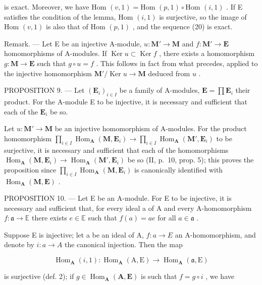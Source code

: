 is exact. Moreover, we have Hom \((v, 1) = \text{Hom } (p, 1) \circ \text{Hom } (i, 1)\) . If E satisfies the condition of the lemma, Hom \((i, 1)\) is surjective, so the image of Hom \((v, 1)\) is also that of Hom \((p, 1)\) , and the sequence (20) is exact.

Remark. --- Let E be an injective A-module, \(u: \mathbf{M}' \to \mathbf{M}\) and \(f: \mathbf{M}' \to \mathbf{E}\) homomorphisms of A-modules. If \(\operatorname{Ker} u \subset \operatorname{Ker} f\) , there exists a homomorphism \(g: \mathbf{M} \to \mathbf{E}\) such that \(g \circ u = f\) . This follows in fact from what precedes, applied to the injective homomorphism \(\mathbf{M}' / \operatorname{Ker} u \to \mathbf{M}\) deduced from \(u\) .

PROPOSITION 9. --- Let \((\mathbf{E}_i)_{i\in I}\) be a family of A-modules, \(\mathbf{E} = \prod \mathbf{E}_i\) their product. For the A-module E to be injective, it is necessary and sufficient that each of the \(\mathbf{E}_i\) be so.

Let \(u: \mathbf{M}' \to \mathbf{M}\) be an injective homomorphism of A-modules. For the product homomorphism \(\prod_{i \in I} \operatorname{Hom}_{\mathbf{A}}(\mathbf{M}, \mathbf{E}_i) \to \prod_{i \in I} \operatorname{Hom}_{\mathbf{A}}(\mathbf{M}', \mathbf{E}_i)\) to be surjective, it is necessary and sufficient that each of the homomorphisms \(\operatorname{Hom}_{\mathbf{A}}(\mathbf{M}, \mathbf{E}_i) \to \operatorname{Hom}_{\mathbf{A}}(\mathbf{M}', \mathbf{E}_i)\) be so (II, p.~10, prop. 5); this proves the proposition since \(\prod_{i \in I} \operatorname{Hom}_{\mathbf{A}}(\mathbf{M}, \mathbf{E}_i)\) is canonically identified with \(\operatorname{Hom}_{\mathbf{A}}(\mathbf{M}, \mathbf{E})\) .

PROPOSITION 10. --- Let E be an A-module. For E to be injective, it is necessary and sufficient that, for every ideal a of A and every A-homomorphism \(f: \mathfrak{a} \to \mathbb{E}\) there exists \(e \in \mathbb{E}\) such that \(f(a) = ae\) for all \(a \in \mathfrak{a}\) .

Suppose E is injective; let a be an ideal of A, \(f : a \to E\) an A-homomorphism, and denote by \(i : a \to A\) the canonical injection. Then the map

\[
\operatorname{Hom} _ {\mathbf {A}} (i, 1): \operatorname{Hom} _ {\mathbf {A}} (\mathrm{A}, \mathrm{E}) \rightarrow \operatorname{Hom} _ {\mathbf {A}} (\mathfrak {a}, \mathrm{E})
\]

is surjective (def. 2); if \(g \in \operatorname{Hom}_{\mathbf{A}}(\mathbf{A}, \mathbf{E})\) is such that \(f = g \circ i\) , we have

